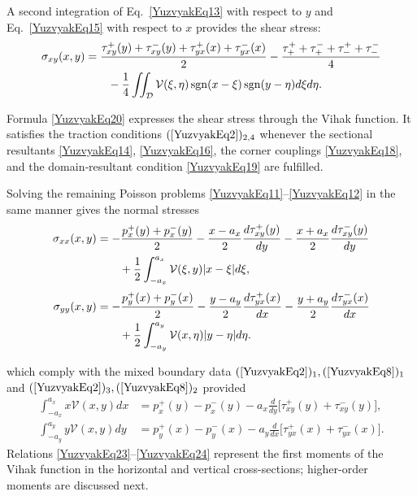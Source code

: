 A second integration of Eq.~\eqref{YuzvyakEq13} with respect to \(y\) and
Eq.~\eqref{YuzvyakEq15} with respect to \(x\) provides the shear stress:
\begin{align}
	\sigma_{xy}(x,y)&=
	\frac{\tau_{xy}^{+}(y)+\tau_{xy}^{-}(y)+\tau_{yx}^{+}(x)+\tau_{yx}^{-}(x)}{2}
	-\frac{\tau_{+}^{+}+\tau_{+}^{-}+\tau_{-}^{+}+\tau_{-}^{-}}{4}
	\notag\\
	&\qquad-\frac{1}{4}\iint_{\mathcal{D}}
	\mathcal{V}(\xi,\eta) 
	\operatorname{sgn}(x-\xi)\operatorname{sgn}(y-\eta) d\xi d\eta .
	\label{YuzvyakEq20}
\end{align}

Formula \eqref{YuzvyakEq20} expresses the shear stress through the
Vihak function.  It satisfies the traction conditions
$(\ref{YuzvyakEq2})_{2,4}$ whenever the sectional resultants
\eqref{YuzvyakEq14}, \eqref{YuzvyakEq16}, the corner couplings
\eqref{YuzvyakEq18}, and the domain‐resultant condition
\eqref{YuzvyakEq19} are fulfilled.


Solving the remaining Poisson problems
\eqref{YuzvyakEq11}–\eqref{YuzvyakEq12} in the same manner gives the
normal stresses
\begin{align}
	\sigma_{xx}(x,y)
	&=-\frac{p_{x}^{+}(y)+p_{x}^{-}(y)}{2}
	-\frac{x-a_{x}}{2} \frac{d\tau_{xy}^{+}(y)}{dy}
	-\frac{x+a_{x}}{2} \frac{d\tau_{xy}^{-}(y)}{dy} \notag\\
	&\qquad
	+\frac{1}{2}\int_{-a_{x}}^{a_{x}}
	\mathcal{V}(\xi,y) \lvert x-\xi\rvert d\xi,
	\label{YuzvyakEq21}\\[3pt]
	\sigma_{yy}(x,y)
	&=-\frac{p_{y}^{+}(x)+p_{y}^{-}(x)}{2}
	-\frac{y-a_{y}}{2} \frac{d\tau_{yx}^{+}(x)}{dx}
	-\frac{y+a_{y}}{2} \frac{d\tau_{yx}^{-}(x)}{dx} \notag\\
	&\qquad
	+\frac{1}{2}\int_{-a_{y}}^{a_{y}}
	\mathcal{V}(x,\eta) \lvert y-\eta\rvert d\eta.
	\label{YuzvyakEq22}
\end{align}

\noindent which comply with the mixed boundary data
$(\ref{YuzvyakEq2})_1,(\ref{YuzvyakEq8})_1$ and
$(\ref{YuzvyakEq2})_3,(\ref{YuzvyakEq8})_2$ provided
\begin{align}
	\int_{-a_{x}}^{a_{x}} x \mathcal{V}(x,y) dx&=
	p_{x}^{+}(y)-p_{x}^{-}(y)
	-a_{x} \frac{d}{dy}\bigl[\tau_{xy}^{+}(y)+\tau_{xy}^{-}(y)\bigr],
	\label{YuzvyakEq23}
\\
	\int_{-a_{y}}^{a_{y}} y \mathcal{V}(x,y) dy&=
	p_{y}^{+}(x)-p_{y}^{-}(x)
	-a_{y} \frac{d}{dx}\bigl[\tau_{yx}^{+}(x)+\tau_{yx}^{-}(x)\bigr].
	\label{YuzvyakEq24}
\end{align}
Relations \eqref{YuzvyakEq23}–\eqref{YuzvyakEq24} represent the first
moments of the Vihak function in the horizontal and vertical
cross-sections; higher-order moments are discussed next.

